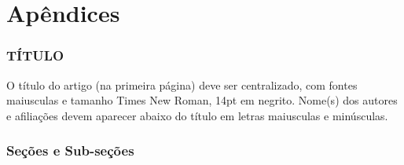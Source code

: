 



%    
\appendix
\part*{Apêndices}

\section{TÍTULO}

O título do artigo (na primeira página) deve ser centralizado, com fontes maiusculas e tamanho Times New Roman, 14pt em negrito. Nome(s) dos autores e afiliações devem aparecer abaixo do título em letras maiusculas e minúsculas.


\section{Seções e Sub-seções}

